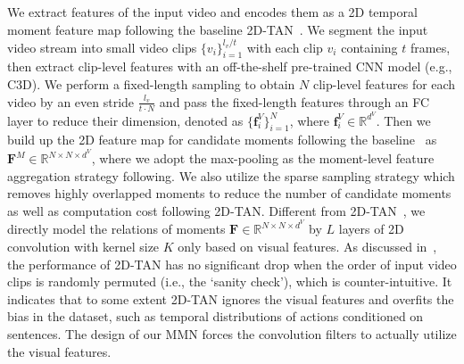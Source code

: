 \documentclass[letterpaper]{article} \usepackage{aaai22}  \usepackage{times}  \usepackage{helvet}  \usepackage{courier}  \usepackage[hyphens]{url}  \usepackage{graphicx} \urlstyle{rm} \def\UrlFont{\rm}  \usepackage{natbib}  \usepackage{caption} \DeclareCaptionStyle{ruled}{labelfont=normalfont,labelsep=colon,strut=off} \frenchspacing  \setlength{\pdfpagewidth}{8.5in}  \setlength{\pdfpageheight}{11in}  \usepackage{algorithm}
\begin{document}
 We extract features of the input video and encodes them as a 2D temporal moment feature map following the baseline 2D-TAN~\cite{DBLP:conf/aaai/ZhangPFL20}. We segment the input video stream into small video clips $\{v_i\}_{i=1}^{l_v / t}$ with each clip $v_i$ containing $t$ frames, then extract clip-level features with an off-the-shelf pre-trained CNN model (e.g., C3D). We perform a fixed-length sampling to obtain $N$ clip-level features for each video by an even stride $\frac{l_v}{t \cdot N}$ and pass the fixed-length features through an FC layer to reduce their dimension, denoted as $\{\mathbf{f}^V_i\}_{i=1}^{N}$, where $\mathbf{f}^V_i \in \mathbb{R}^{d^V}$. Then we build up the 2D feature map for candidate moments following the baseline~\cite{DBLP:conf/aaai/ZhangPFL20} as $\mathbf{F}^{M} \in \mathbb{R}^{N \times N \times d^{V}}$, where we adopt the max-pooling as the moment-level feature aggregation strategy following. We also utilize the sparse sampling strategy which removes highly overlapped moments to reduce the number of candidate moments as well as computation cost following 2D-TAN. Different from 2D-TAN~\cite{DBLP:conf/aaai/ZhangPFL20}, we directly model the relations of moments $\mathbf{F} \in \mathbb{R}^{N \times N \times d^{V}}$ by $L$ layers of 2D convolution with kernel size $K$ only based on visual features. As discussed in~\cite{DBLP:conf/bmvc/OtaniNRH20}, the performance of 2D-TAN has no significant drop when the order of input video clips is randomly permuted (i.e., the `sanity check'), which is counter-intuitive. It indicates that to some extent 2D-TAN ignores the visual features and overfits the bias in the dataset, such as temporal distributions of actions conditioned on sentences. The design of our MMN forces the convolution filters to actually utilize the visual features. 
\end{document}
